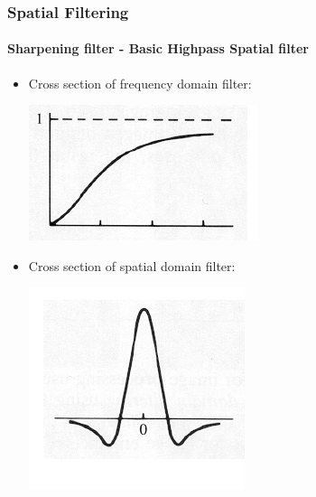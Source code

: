 \documentclass{beamer}
\begin{document}
\begin{frame}
\frametitle{Spatial Filtering}
\framesubtitle{Sharpening filter - Basic Highpass Spatial filter}
\begin{itemize}
\item Cross section of frequency domain filter:
\begin{center}\includegraphics[scale=0.5]{images/HPS-f.png}\end{center} 
\item Cross section of spatial domain filter:
\begin{center}\includegraphics[scale=0.5]{images/HPS-S.png}\end{center} 
\end{itemize}
\end{frame}
\end{document}

